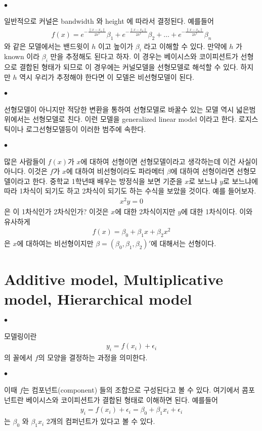 \documentclass[12pt,oneside,english,a4paper]{article}
\def\ck{\paragraph{\Large$\bullet$}\Large}
\begin{document}
\ck 일반적으로 커널은 bandwidth 와 height 에 따라서 결정된다. 예를들어 
\begin{align*}
f(x)=e^{-\frac{\| x-x_1\|}{2h^2}}\beta_1+e^{-\frac{\| x-x_2\|}{2h^2}} \beta_2+\dots+e^{-\frac{\| x-x_n\|}{2h^2} }\beta_n
\end{align*}
와 같은 모델에서는 밴드윗이 $h$ 이고 높이가 $\beta_i$ 라고 이해할 수 있다. 만약에 $h$ 가 known 이라 $\beta_i$ 만을 추정해도 된다고 하자. 이 경우는 베이시스와 코이피션트가 선형으로 결합된 형태가 되므로 이 경우에는 커널모델을 선형모델로 해석할 수 있다. 하지만 $h$ 역시 우리가 추정해야 한다면 이 모델은 비선형모델이 된다. 

\ck 선형모델이 아니지만 적당한 변환을 통하여 선형모델로 바꿀수 있는 모델 역시 넓은범위에서는 선형모델로 친다. 이런 모델을 generalized linear model 이라고 한다. 로지스틱이나 로그선형모델등이 이러한 범주에 속한다. 

\ck 많은 사람들이 $f(x)$가 $x$에 대하여 선형이면 선형모델이라고 생각하는데 이건 사실이 아니다. 이것은 $f$가 $x$에 대하여 비선형이라도 파라메터 $\beta$에 대하여 선형이라면 선형모델이라고 한다. 중학교 1학년때 배우는 방정식을 보면 기준을 $x$로 보느냐 $y$로 보느냐에 따라 1차식이 되기도 하고 2차식이 되기도 하는 수식을 보았을 것이다. 예를 들어보자. 
\begin{align*}
x^2 y= 0
\end{align*} 
은 이 1차식인가 2차식인가? 이것은 $x$에 대한 2차식이지만 $y$에 대한 1차식이다. 이와 유사하게 
\begin{align*}
f(x)=\beta_0+\beta_1 x + \beta_2 x^2
\end{align*}
은 $x$에 대하여는 비선형이지만 $\beta=(\beta_0,\beta_1,\beta_2)'$에 대해서는 선형이다. 

\section{Additive model, Multiplicative model, Hierarchical model}

\ck 모델링이란 
\begin{align*}
y_i=f(x_i)+\epsilon_i
\end{align*}
의 꼴에서 $f$의 모양을 결정하는 과정을 의미한다. 

\ck 이때 $f$는 컴포넌트(component) 들의 조합으로 구성된다고 볼 수 있다. 여기에서 콤포넌트란 베이시스와 코이피션트가 결합된 형태로 이해하면 된다. 예를들어 
\begin{align*}
y_i=f(x_i)+\epsilon_i=\beta_0+ \beta_1x_i+\epsilon_i
\end{align*}
는 $\beta_0$ 와 $\beta_1 x_i$ 2개의 컴퍼넌트가 있다고 볼 수 있다. 
\end{document}
